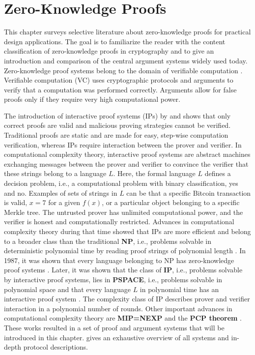 \chapter{Zero-Knowledge Proofs}
This chapter surveys selective literature about zero-knowledge proofs for practical design applications. The goal is to familiarize the reader with the content classification of zero-knowledge proofs in cryptography and to give an introduction and comparison of the central argument systems widely used today. Zero-knowledge proof systems belong to the domain of verifiable computation \citep{Simunic, Ahmad}. Verifiable computation (VC) uses cryptographic protocols and arguments to verify that a computation was performed correctly. Arguments allow for false proofs only if they require very high computational power. 

The introduction of interactive proof systems (IPs) by \citet{GoldwasserIPs} and \citet{BabaiIPs} shows that only correct proofs are valid and malicious proving strategies cannot be verified. Traditional proofs are static and are made for easy, step-wise computation verification, whereas IPs require interaction between the prover and verifier. In computational complexity theory, interactive proof systems are abstract machines exchanging messages between the prover and verifier to convince the verifier that these strings belong to a language \(L\). Here, the formal language \(L\) defines a decision problem, i.e., a computational problem with binary classification, yes and no. Examples of sets of strings in \(L\) can be that a specific Bitcoin transaction is valid, \(x = 7\) for a given \(f(x)\), or a particular object belonging to a specific Merkle tree. The untrusted prover has unlimited computational power, and the verifier is honest and computationally restricted. Advances in computational complexity theory during that time showed that IPs are more efficient and belong to a broader class than the traditional \textbf{NP}, i.e., problems solvable in deterministic polynomial time by reading proof strings of polynomial length \citep{SassonIOPsinproceedings}. In 1987, it was shown that every language belonging to NP has zero-knowledge proof systems \citep{anymental10.1145/28395.28420}. Later, it was shown that the class of \textbf{IP}, i.e., problems solvable by interactive proof systems, lies in \textbf{PSPACE}, i.e., problems solvable in polynomial space \citep{Shamir10.1145/146585.146609} and that every language \(L\) in polynomial time has an interactive proof system \citep{Lund10.1145/146585.146605}. The complexity class of IP describes prover and verifier interaction in a polynomial number of rounds. Other important advances in computational complexity theory are \textbf{MIP=NEXP} \citep{Laszlo} and the \textbf{PCP theorem} \citep{PCPTheorem}. These works resulted in a set of proof and argument systems that will be introduced in this chapter. \citet{Thaler} gives an exhaustive overview of all systems and in-depth protocol descriptions. 

